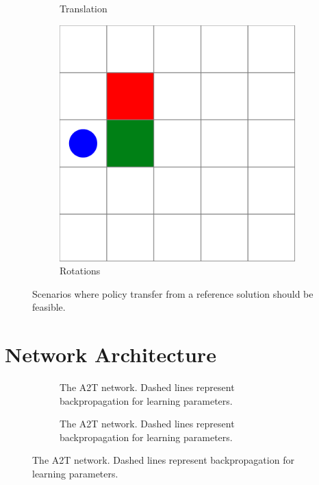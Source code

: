 \begin{figure}
\begin{subfigure}[b]{0.375\textwidth}
        \caption{Translation}  
        \label{fig:ivm_translation}
    \end{subfigure}
    \hfill
    \begin{subfigure}[b]{0.375\textwidth}   
        \centering 
        \includegraphics[width=\textwidth]{figures/iterative_validation/gridworld4.pdf}
        \caption{Rotations}
        \label{fig:ivm_rotation}
    \end{subfigure}
    \caption{Scenarios where policy transfer from a reference solution should be feasible.}
    \label{fig:ivm}
\end{figure}

\section{Network Architecture}
\begin{figure}[!t]
\centering
 \begin{subfigure}[b]{0.475\textwidth}
    
    \caption{The A2T network. Dashed lines represent backpropagation for learning parameters.}
    \label{fig:A2T_Network}
    \end{subfigure}
    \hfill
    \begin{subfigure}[b]{0.475\textwidth}
        
        \caption{The A2T network. Dashed lines represent backpropagation for learning parameters.}
        \label{fig:A2T_Network}
    \end{subfigure}
\end{figure}

